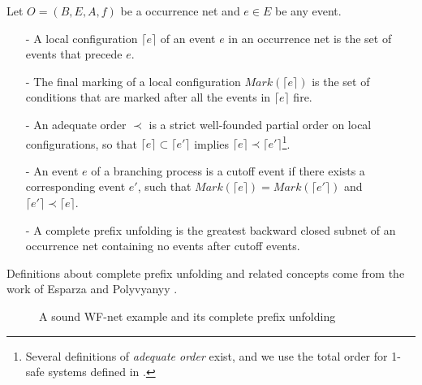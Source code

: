 \documentclass{llncs}
\begin{document}
\begin{definition}\label{def:cpu}
Let $O=(B,E,A,f)$ be a occurrence net and $e\in E$ be any event.
	\begin{itemize}
		\item[-] A local configuration $\lceil e\rceil$ of an event $e$ in an occurrence net is the set of events that precede $e$.
		\item[-] The final marking of a local configuration $Mark(\lceil e\rceil)$ is the set of conditions that are marked after all the events in $\lceil e\rceil$ fire.
		\item[-] An adequate order $\prec$ is a strict well-founded partial order on local configurations, so that $\lceil e\rceil\subset\lceil e'\rceil$ implies $\lceil e\rceil\prec\lceil e'\rceil$\footnote{Several definitions of \textit{adequate order} exist, and we use the total order for 1-safe systems defined in \cite{esparza1996improvement}.}.
		\item[-] An event $e$ of a branching process is a cutoff event if there exists a corresponding event $e'$, such that $Mark(\lceil e\rceil)=Mark(\lceil e'\rceil)$ and $\lceil e'\rceil\prec\lceil e\rceil$.
		\item[-] A complete prefix unfolding is the greatest backward closed subnet of an occurrence net containing no events after cutoff events.
	\end{itemize}
\end{definition}

Definitions about complete prefix unfolding and related concepts come from the work of Esparza \cite{esparza1996improvement} and Polyvyanyy \cite{polyvyanyy2010structuring}.

\begin{figure}[ht]
\centering
{}
\caption{A sound WF-net example and its complete prefix unfolding\label{fig:examplePetriAndCpu}}
\end{figure}
\end{document}
